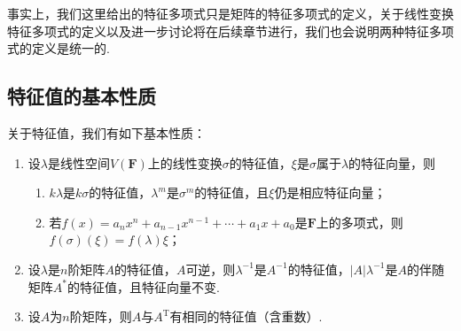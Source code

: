 事实上，我们这里给出的特征多项式只是矩阵的特征多项式的定义，关于线性变换特征多项式的定义以及进一步讨论将在后续章节进行，我们也会说明两种特征多项式的定义是统一的.

\subsection{特征值的基本性质}

关于特征值，我们有如下基本性质：
\begin{enumerate}
    \item 设$\lambda$是线性空间$V(\mathbf{F})$上的线性变换$\sigma$的特征值，$\xi$是$\sigma$属于$\lambda$的特征向量，则
          \begin{enumerate}
              \item $k\lambda$是$k\sigma$的特征值，$\lambda^m$是$\sigma^m$的特征值，且$\xi$仍是相应特征向量；

              \item 若$f(x)=a_nx^n+a_{n-1}x^{n-1}+\cdots+a_1x+a_0$是$\mathbf{F}$上的多项式，则$f(\sigma)(\xi)=f(\lambda)\xi$；
          \end{enumerate}

    \item 设$\lambda$是$n$阶矩阵$A$的特征值，$A$可逆，则$\lambda^{-1}$是$A^{-1}$的特征值，$|A|\lambda^{-1}$是$A$的伴随矩阵$A^*$的特征值，且特征向量不变.

    \item 设$A$为$n$阶矩阵，则$A$与$A^\mathrm{T}$有相同的特征值（含重数）.
\end{enumerate}

